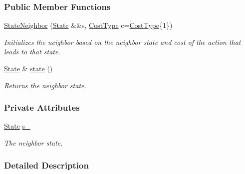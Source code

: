 \subsubsection*{Public Member Functions}
\begin{DoxyCompactItemize}
\item 
\hyperlink{structslb_1_1core_1_1sb_1_1StateNeighbor_a92d4764300b26543e2c5c42c95dcd1cc}{State\+Neighbor} (\hyperlink{structslb_1_1core_1_1sb_1_1Cost_af5d4c57aa664e5ae63eb365e1cecaf92}{State} \&\&s, \hyperlink{structslb_1_1core_1_1sb_1_1Cost_a383726dcecbf69f396aa3a6d34b60278}{Cost\+Type} c=\hyperlink{structslb_1_1core_1_1sb_1_1Cost_a383726dcecbf69f396aa3a6d34b60278}{Cost\+Type}\{1\})
\begin{DoxyCompactList}\small\item\em Initializes the neighbor based on the neighbor state and cost of the action that leads to that state. \end{DoxyCompactList}\item 
\hyperlink{structslb_1_1core_1_1sb_1_1Cost_af5d4c57aa664e5ae63eb365e1cecaf92}{State} \& \hyperlink{structslb_1_1core_1_1sb_1_1StateNeighbor_ad2215fd65761ad16d7ad56c32d197705}{state} ()
\begin{DoxyCompactList}\small\item\em Returns the neighbor state. \end{DoxyCompactList}\end{DoxyCompactItemize}
\subsubsection*{Private Attributes}
\begin{DoxyCompactItemize}
\item 
\hyperlink{structslb_1_1core_1_1sb_1_1Cost_af5d4c57aa664e5ae63eb365e1cecaf92}{State} \hyperlink{structslb_1_1core_1_1sb_1_1StateNeighbor_af1d6abd35bd7a30620dd7d0ea7798972}{s\+\_\+}\hypertarget{structslb_1_1core_1_1sb_1_1StateNeighbor_af1d6abd35bd7a30620dd7d0ea7798972}{}\label{structslb_1_1core_1_1sb_1_1StateNeighbor_af1d6abd35bd7a30620dd7d0ea7798972}

\begin{DoxyCompactList}\small\item\em The neighbor state. \end{DoxyCompactList}\end{DoxyCompactItemize}


\subsubsection{Detailed Description}
